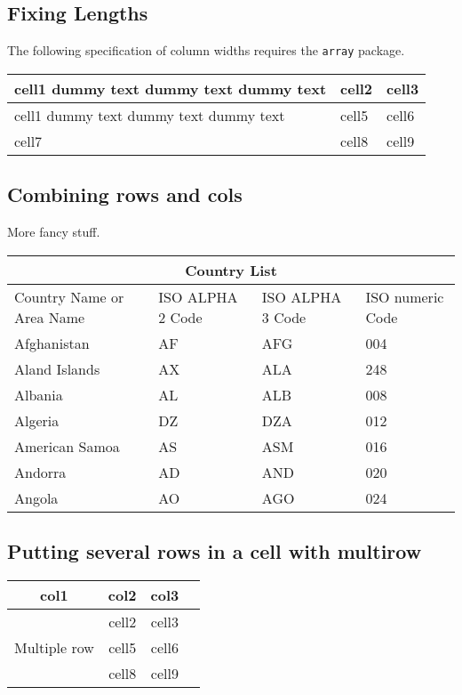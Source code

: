 \subsection{Fixing Lengths}
The following specification of column widths requires the \verb+array+ package.

\begin{center}
	\begin{tabular}{ | m{5em} | m{1cm}| m{1cm} | } 
		\hline
		cell1 dummy text dummy text dummy text& cell2 & cell3 \\ 
		\hline
		cell1 dummy text dummy text dummy text & cell5 & cell6 \\ 
		\hline
		cell7 & cell8 & cell9 \\ 
		\hline
	\end{tabular}
\end{center}


\subsection{Combining rows and cols}
More fancy stuff.

\begin{tabular}{ |p{3cm}||p{3cm}|p{3cm}|p{3cm}|  }
	\hline
	\multicolumn{4}{|c|}{Country List} \\
	\hline
	Country Name     or Area Name& ISO ALPHA 2 Code &ISO ALPHA 3 Code&ISO numeric Code\\
	\hline
	Afghanistan   & AF    &AFG&   004\\
	Aland Islands&   AX  & ALA   &248\\
	Albania &AL & ALB&  008\\
	Algeria    &DZ & DZA&  012\\
	American Samoa&   AS  & ASM&016\\
	Andorra& AD  & AND   &020\\
	Angola& AO  & AGO&024\\
	\hline
\end{tabular}


\subsection{Putting several rows in a cell with multirow}

\begin{center}
	\begin{tabular}{ |c|c|c|c| } 
		\hline
		col1 & col2 & col3 \\
		\hline
		\multirow{3}{4em}{Multiple row} & cell2 & cell3 \\ 
		& cell5 & cell6 \\ 
		& cell8 & cell9 \\ 
		\hline
	\end{tabular}
\end{center}

